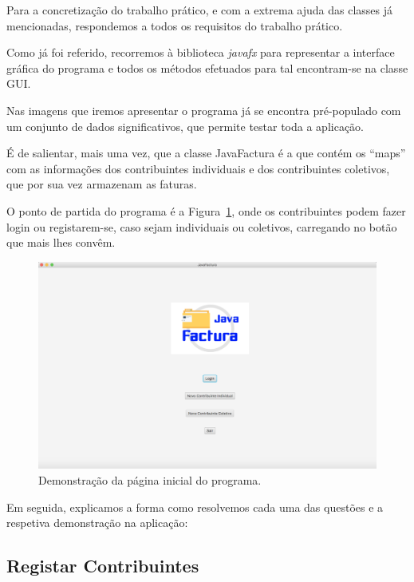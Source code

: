 \documentclass[a4paper]{article}
\begin{document}
Para a concretização do trabalho prático, e com a extrema ajuda das classes já
mencionadas, respondemos a todos os requisitos do trabalho prático.

Como já foi referido, recorremos à biblioteca \emph{javafx} para representar
a interface gráfica do programa e todos os métodos efetuados para tal encontram-se
na classe \textsf{GUI}.

Nas imagens que iremos apresentar o programa já se
encontra pré-populado com um conjunto de dados significativos, que permite
testar toda a aplicação.

É de salientar, mais uma vez, que a classe \textsf{JavaFactura} é a que contém
os ``maps'' com as informações dos contribuintes individuais e dos contribuintes coletivos,
que por sua vez armazenam as faturas.

O ponto de partida do programa é a Figura~\ref{img:ecrainicial}, onde os contribuintes
podem fazer login ou registarem-se, caso sejam individuais ou coletivos, carregando no
botão que mais lhes convêm.

\begin{figure}[H]
\centering
\includegraphics[scale=0.20]{imgs/ecrainicial.png}
\caption{Demonstração da página inicial do programa.}
\label{img:ecrainicial}
\end{figure}

Em seguida, explicamos a forma como resolvemos cada uma das questões e a respetiva
demonstração na aplicação:


\subsection{Registar Contribuintes}
\label{sec:registarcontribuintes}
\end{document}
